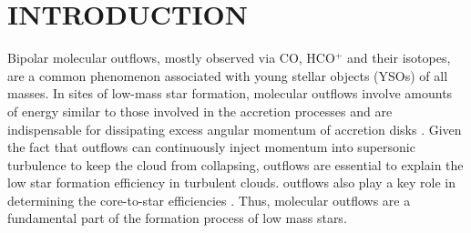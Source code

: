 \section{INTRODUCTION}
Bipolar molecular outflows, mostly observed via CO, HCO$^+$ and their isotopes, are a common phenomenon associated with young stellar objects (YSOs) of all masses\citep{ 1985ARA&A..23..267L,1993prpl.conf..603F, 2001ApJ...552L.167Z,2002A&A...383..892B, 2004A&A...426..503W, 2005AJ....129..330W, 2007prpl.conf..245A, 2015MNRAS.453..645M}. In sites of low-mass star formation, molecular outflows involve amounts of energy similar to those involved in the accretion processes and are indispensable for dissipating excess angular momentum of accretion disks \citep{1987ARA&A..25...23S, 1996ARA&A..34..111B}. Given the fact that outflows can continuously inject momentum into supersonic turbulence to keep the cloud from collapsing, outflows are essential to explain the low star formation efficiency in turbulent clouds. outflows also play a key role in determining the core-to-star efficiencies \citep{2014prpl.conf..451F}. Thus, molecular outflows are a fundamental part of the formation process of low mass stars. 


